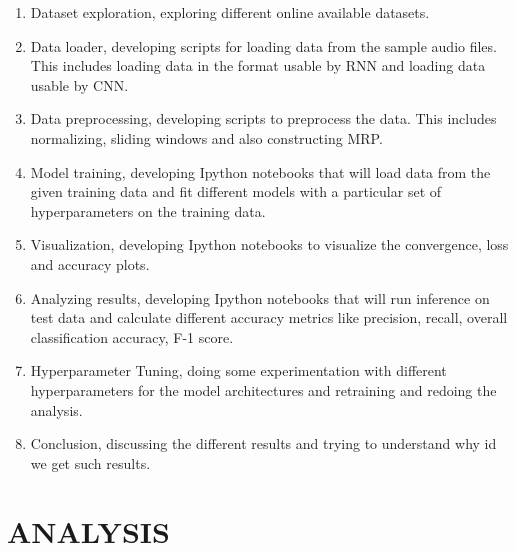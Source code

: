 \documentclass[letterpaper, 12 pt, conference]{ieeeconf}  %
\begin{document}
\begin{enumerate}
  \item Dataset exploration, exploring different online available datasets. 
  \item Data loader, developing scripts for loading data from the sample audio files. This includes loading data in the format usable by RNN and loading data usable by CNN.
  \item Data preprocessing, developing scripts to preprocess the data. This includes normalizing, sliding windows and also constructing MRP.
  \item Model training, developing Ipython notebooks that will load data from the given training data and fit different models with a particular set of hyperparameters on the training data.
  \item Visualization, developing Ipython notebooks to visualize the convergence, loss and accuracy plots.
  \item Analyzing results, developing Ipython notebooks that will run inference on test data and calculate different accuracy metrics like precision, recall, overall classification accuracy, F-1 score.
  \item Hyperparameter Tuning, doing some experimentation with different hyperparameters for the model architectures and retraining and redoing the analysis.
  \item Conclusion, discussing the different results and trying to understand why id we get such results.
\end{enumerate}



\section{ANALYSIS}
\end{document}
